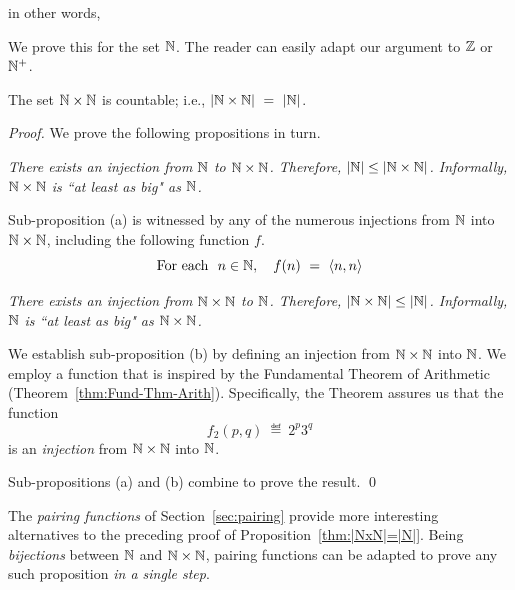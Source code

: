 \noindent
in other words, \\
\hspace*{.35in}{\em Pairing does not increase a set's order of infinity.}

\noindent
We prove this for the set $\mathbb{N}$.  The reader can easily adapt our argument to $\mathbb{Z}$ or $\mathbb{N}^+$.

\begin{prop}
\label{thm:|NxN|=|N|}
The set $\mathbb{N} \times \mathbb{N}$ is countable; i.e., $|\mathbb{N} \times \mathbb{N}| \ = \ |\mathbb{N}|$.
\end{prop}

\begin{proof}
We prove the following propositions in turn.

\medskip

{\em There exists an injection from $\mathbb{N}$ to $\mathbb{N} \times \mathbb{N}$.  Therefore, $|\mathbb{N}| \leq |\mathbb{N} \times \mathbb{N}|$. Informally, $\mathbb{N} \times \mathbb{N}$ is ``at least as big" as $\mathbb{N}$.}

\smallskip

\noindent
Sub-proposition (a) is witnessed by any of the numerous injections from $\mathbb{N}$ into $\mathbb{N} \times \mathbb{N}$, including the following function $f$.
\[ \mbox{For each } \ n \in \mathbb{N}, \ \ \ f(n) \ = \ \langle n,n \rangle \]

\medskip

{\em There exists an injection from $\mathbb{N} \times \mathbb{N}$ to $\mathbb{N}$.  Therefore, $|\mathbb{N} \times \mathbb{N}| \leq |\mathbb{N}|$. Informally, $\mathbb{N}$ is ``at least as big" as $\mathbb{N} \times \mathbb{N}$.}

\smallskip

\noindent
We establish sub-proposition (b) by defining an injection from $\mathbb{N} \times \mathbb{N}$ into $\mathbb{N}$.  We employ a function that is inspired by the Fundamental Theorem of Arithmetic (Theorem~\ref{thm:Fund-Thm-Arith}).  Specifically, the Theorem assures us that the function
\[ f_2(p,q) \ \eqdef \ 2^p 3^q \]
is an {\em injection} from $\mathbb{N} \times \mathbb{N}$ into $\mathbb{N}$.

\medskip

Sub-propositions (a) and (b) combine to prove the result.  \qed
\end{proof}

\bigskip

The {\it pairing functions} of Section~\ref{sec:pairing} provide more interesting alternatives to the preceding proof of Proposition~\ref{thm:|NxN|=|N|}.  Being {\em bijections} between $\mathbb{N}$ and $\mathbb{N} \times \mathbb{N}$, pairing functions can be adapted to prove any such proposition {\em in a single step}. 


